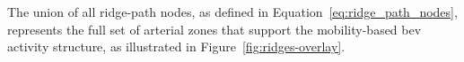 The union of all ridge-path nodes, as defined in Equation~\eqref{eq:ridge_path_nodes}, represents the full set of arterial zones that support the mobility-based \gls{bev} activity structure, as illustrated in Figure~\ref{fig:ridges-overlay}.
